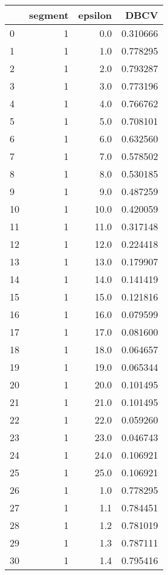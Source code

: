 \begin{tabular}{lrrr}
\toprule
{} &  segment &  epsilon &      DBCV \\
\midrule
0   &        1 &      0.0 &  0.310666 \\
1   &        1 &      1.0 &  0.778295 \\
2   &        1 &      2.0 &  0.793287 \\
3   &        1 &      3.0 &  0.773196 \\
4   &        1 &      4.0 &  0.766762 \\
5   &        1 &      5.0 &  0.708101 \\
6   &        1 &      6.0 &  0.632560 \\
7   &        1 &      7.0 &  0.578502 \\
8   &        1 &      8.0 &  0.530185 \\
9   &        1 &      9.0 &  0.487259 \\
10  &        1 &     10.0 &  0.420059 \\
11  &        1 &     11.0 &  0.317148 \\
12  &        1 &     12.0 &  0.224418 \\
13  &        1 &     13.0 &  0.179907 \\
14  &        1 &     14.0 &  0.141419 \\
15  &        1 &     15.0 &  0.121816 \\
16  &        1 &     16.0 &  0.079599 \\
17  &        1 &     17.0 &  0.081600 \\
18  &        1 &     18.0 &  0.064657 \\
19  &        1 &     19.0 &  0.065344 \\
20  &        1 &     20.0 &  0.101495 \\
21  &        1 &     21.0 &  0.101495 \\
22  &        1 &     22.0 &  0.059260 \\
23  &        1 &     23.0 &  0.046743 \\
24  &        1 &     24.0 &  0.106921 \\
25  &        1 &     25.0 &  0.106921 \\
26  &        1 &      1.0 &  0.778295 \\
27  &        1 &      1.1 &  0.784451 \\
28  &        1 &      1.2 &  0.781019 \\
29  &        1 &      1.3 &  0.787111 \\
30  &        1 &      1.4 &  0.795416 \\

\end{tabular}
